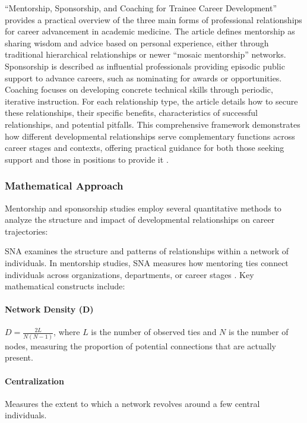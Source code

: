 \documentclass[main.tex]{subfiles}
\begin{document}
``Mentorship, Sponsorship, and Coaching for Trainee Career Development'' provides a practical overview of the three main forms of professional relationships for career advancement in academic medicine. The article defines mentorship as sharing wisdom and advice based on personal experience, either through traditional hierarchical relationships or newer ``mosaic mentorship'' networks. Sponsorship is described as influential professionals providing episodic public support to advance careers, such as nominating for awards or opportunities. Coaching focuses on developing concrete technical skills through periodic, iterative instruction. For each relationship type, the article details how to secure these relationships, their specific benefits, characteristics of successful relationships, and potential pitfalls. This comprehensive framework demonstrates how different developmental relationships serve complementary functions across career stages and contexts, offering practical guidance for both those seeking support and those in positions to provide it \parencite{rsna2021mentorship}.

\subsubsection{Mathematical Approach}

Mentorship and sponsorship studies employ several quantitative methods to analyze the structure and impact of developmental relationships on career trajectories:

SNA examines the structure and patterns of relationships within a network of individuals. In mentorship studies, SNA measures how mentoring ties connect individuals across organizations, departments, or career stages \parencite{cdc2015network}. Key mathematical constructs include:

\paragraph{Network Density (D)} \( D = \frac{2L}{N(N-1)} \), where \( L \) is the number of observed ties and \( N \) is the number of nodes, measuring the proportion of potential connections that are actually present.

\paragraph{Centralization} Measures the extent to which a network revolves around a few central individuals.
\end{document}
